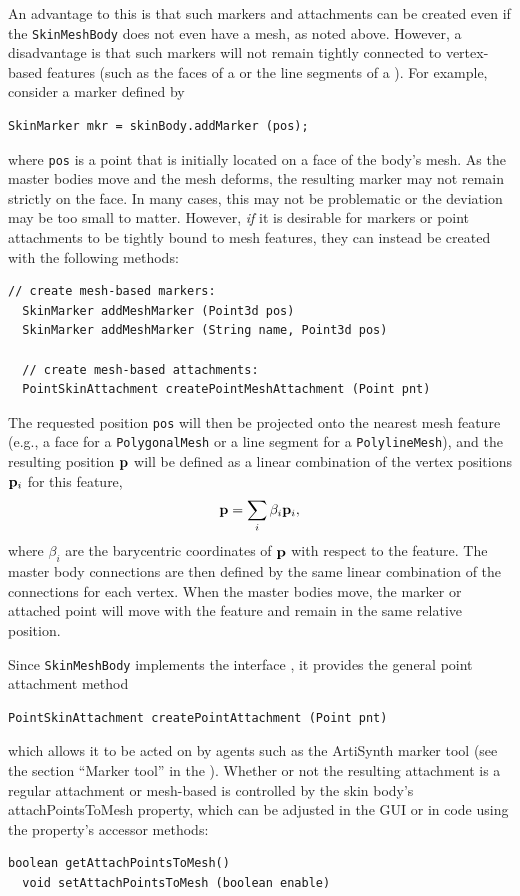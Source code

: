 An advantage to this is that such markers and attachments can be
created even if the {\tt SkinMeshBody} does not even have a mesh, as
noted above. However, a disadvantage is that such markers will not
remain tightly connected to vertex-based features (such as the faces
of a  or the line segments
of a ). For example,
consider a marker defined by
%
\begin{lstlisting}[]
  SkinMarker mkr = skinBody.addMarker (pos);
\end{lstlisting}
%
where {\tt pos} is a point that is initially located on a face of the
body's mesh. As the master bodies move and the mesh deforms, the
resulting marker may not remain strictly on the face. In many cases,
this may not be problematic or the deviation may be too small to
matter. However, {\it if} it is desirable for markers or point
attachments to be tightly bound to mesh features, they can instead be
created with the following methods:
%
\begin{lstlisting}[]
  // create mesh-based markers:
  SkinMarker addMeshMarker (Point3d pos)
  SkinMarker addMeshMarker (String name, Point3d pos)

  // create mesh-based attachments:
  PointSkinAttachment createPointMeshAttachment (Point pnt)
\end{lstlisting}
%
The requested position {\tt pos} will then be projected onto the
nearest mesh feature (e.g., a face for a {\tt PolygonalMesh} or a line
segment for a {\tt PolylineMesh}), and the resulting position ${\bf p}$
will be defined as a linear combination of the vertex positions
${\bf p}_i$ for this feature,
%
\begin{equation}
{\bf p} = \sum_i \beta_i {\bf p}_i,
\end{equation}
%
where $\beta_i$ are the barycentric coordinates of ${\bf p}$ with respect
to the feature. The master body connections are then defined by the
same linear combination of the connections for each vertex.  When the
master bodies move, the marker or attached point will move with the
feature and remain in the same relative position.

Since {\tt SkinMeshBody} implements the interface
, it
provides the general point attachment method
%
\begin{lstlisting}[]
  PointSkinAttachment createPointAttachment (Point pnt)
\end{lstlisting}
%
which allows it to be acted on by agents such as the ArtiSynth marker
tool (see the section ``Marker tool'' in the
).  Whether
or not the resulting attachment is a regular attachment or mesh-based
is controlled by the skin body's {\sf attachPointsToMesh} property,
which can be adjusted in the GUI or in code using the property's
accessor methods:
%
\begin{lstlisting}[]
  boolean getAttachPointsToMesh()
  void setAttachPointsToMesh (boolean enable)
\end{lstlisting}
%
